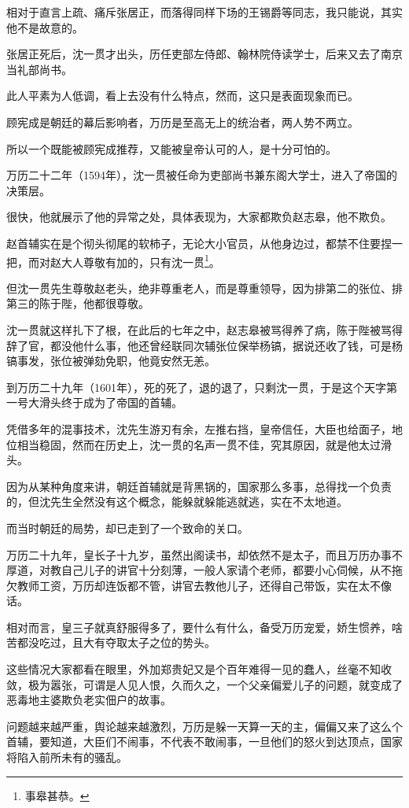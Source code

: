 \begin{multicols}{\theparacolNo}
相对于直言上疏、痛斥张居正，而落得同样下场的王锡爵等同志，我只能说，其实他不是故意的。

张居正死后，沈一贯才出头，历任吏部左侍郎、翰林院侍读学士，后来又去了南京当礼部尚书。

此人平素为人低调，看上去没有什么特点，然而，这只是表面现象而已。

顾宪成是朝廷的幕后影响者，万历是至高无上的统治者，两人势不两立。

所以一个既能被顾宪成推荐，又能被皇帝认可的人，是十分可怕的。

万历二十二年（1594年），沈一贯被任命为吏部尚书兼东阁大学士，进入了帝国的决策层。

很快，他就展示了他的异常之处，具体表现为，大家都欺负赵志皋，他不欺负。

赵首辅实在是个彻头彻尾的软柿子，无论大小官员，从他身边过，都禁不住要捏一把，而对赵大人尊敬有加的，只有沈一贯\footnote{事皋甚恭。}。

但沈一贯先生尊敬赵老头，绝非尊重老人，而是尊重领导，因为排第二的张位、排第三的陈于陛，他都很尊敬。

沈一贯就这样扎下了根，在此后的七年之中，赵志皋被骂得养了病，陈于陛被骂得辞了官，都没他什么事，他还曾经联同次辅张位保举杨镐，据说还收了钱，可是杨镐事发，张位被弹劾免职，他竟安然无恙。

到万历二十九年（1601年），死的死了，退的退了，只剩沈一贯，于是这个天字第一号大滑头终于成为了帝国的首辅。

凭借多年的混事技术，沈先生游刃有余，左推右挡，皇帝信任，大臣也给面子，地位相当稳固，然而在历史上，沈一贯的名声一贯不佳，究其原因，就是他太过滑头。

因为从某种角度来讲，朝廷首辅就是背黑锅的，国家那么多事，总得找一个负责的，但沈先生全然没有这个概念，能躲就躲能逃就逃，实在不太地道。

而当时朝廷的局势，却已走到了一个致命的关口。

万历二十九年，皇长子十九岁，虽然出阁读书，却依然不是太子，而且万历办事不厚道，对教自己儿子的讲官十分刻薄，一般人家请个老师，都要小心伺候，从不拖欠教师工资，万历却连饭都不管，讲官去教他儿子，还得自己带饭，实在太不像话。

相对而言，皇三子就真舒服得多了，要什么有什么，备受万历宠爱，娇生惯养，啥苦都没吃过，且大有夺取太子之位的势头。

这些情况大家都看在眼里，外加郑贵妃又是个百年难得一见的蠢人，丝毫不知收敛，极为嚣张，可谓是人见人恨，久而久之，一个父亲偏爱儿子的问题，就变成了恶毒地主婆欺负老实佃户的故事。

问题越来越严重，舆论越来越激烈，万历是躲一天算一天的主，偏偏又来了这么个首辅，要知道，大臣们不闹事，不代表不敢闹事，一旦他们的怒火到达顶点，国家将陷入前所未有的骚乱。


\end{multicols}
